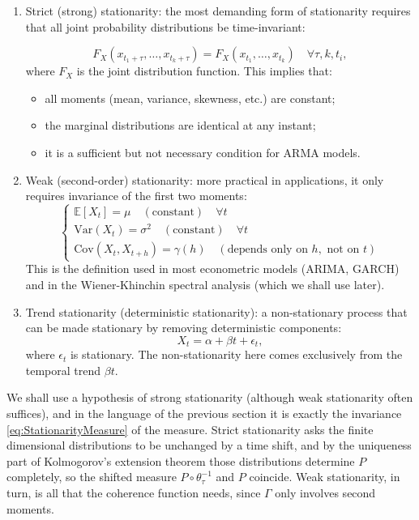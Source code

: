 	\begin{enumerate}
		\item Strict (strong) stationarity: the most demanding form of stationarity requires that all joint probability distributions be time-invariant:

		\begin{equation}
			F_X(x_{t_1+\tau}, \ldots, x_{t_k+\tau}) = F_X(x_{t_1}, \ldots, x_{t_k}) \quad \forall \tau, k, t_i,
		\end{equation}
		where $F_X$ is the joint distribution function. This implies that:
		\begin{itemize}
			\item all moments (mean, variance, skewness, etc.) are constant;
			\item the marginal distributions are identical at any instant;
			\item it is a sufficient but not necessary condition for ARMA models.
		\end{itemize}

		\item Weak (second-order) stationarity: more practical in applications, it only requires invariance of the first two moments:
		\begin{equation}
			\begin{cases}
				\mathbb{E}[X_t] = \mu \quad (\text{constant}) \quad \forall t \\
				\text{Var}(X_t) = \sigma^2 \quad (\text{constant}) \quad \forall t \\
				\text{Cov}(X_t, X_{t+h}) = \gamma(h) \quad (\text{depends only on } h, \text{ not on } t)
			\end{cases}
		\end{equation}
		This is the definition used in most econometric models (ARIMA, GARCH) and in the Wiener-Khinchin spectral analysis (which we shall use later).

		\item Trend stationarity (deterministic stationarity): a non-stationary process that can be made stationary by removing deterministic components:
		\begin{equation}
			X_t = \alpha + \beta t + \epsilon_t,
		\end{equation}
		where $\epsilon_t$ is stationary. The non-stationarity here comes exclusively from the temporal trend $\beta t$.
	\end{enumerate}

	We shall use a hypothesis of strong stationarity (although weak stationarity often
	suffices), and in the language of the previous section it is exactly the invariance
	\eqref{eq:StationarityMeasure} of the measure. Strict stationarity asks the finite
	dimensional distributions to be unchanged by a time shift, and by the uniqueness part of
	Kolmogorov's extension theorem those distributions determine $P$ completely, so the
	shifted measure $P\circ\theta_{\tau}^{-1}$ and $P$ coincide. Weak stationarity, in turn,
	is all that the coherence function needs, since $\Gamma$ only involves second moments.


